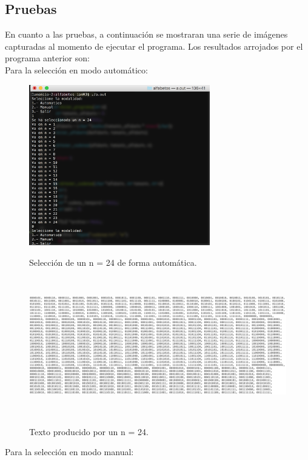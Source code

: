 \documentclass[12pt]{article}
\begin{document}
\newpage
\subsection{Pruebas}
En cuanto a las pruebas, a continuación se mostraran una serie de imágenes capturadas al momento de ejecutar el programa. Los resultados arrojados por el programa anterior son:\\

Para la selección en modo automático:

\begin{figure}[H]
\includegraphics[width=\textwidth, height=7cm]{alfabetos_automatico}
\label{fig:auto_alfabeto}
\caption{Selección de un n = 24 de forma automática.}
\end{figure}

\vspace{1em}

\begin{figure}[H]
\includegraphics[width=\textwidth, height=6cm]{alfabeto_muestra}
\label{fig:auto_alfabeto_texto}
\caption{Texto producido por un n = 24.}
\end{figure}

\vspace{1em}

Para la selección en modo manual:
\end{document}
